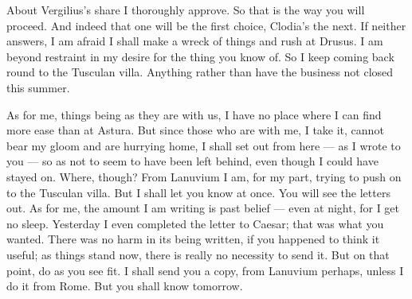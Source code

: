 

 About Vergilius's share I thoroughly approve. So that is the way you will proceed. And indeed that one will be the first choice, Clodia's the next. If neither answers, I am afraid I shall make a wreck of things and rush at Drusus. I am beyond restraint in my desire for the thing you know of. So I keep coming back round to the Tusculan villa. Anything rather than have the business not closed this summer.

 As for me, things being as they are with us, I have no place where I can find more ease than at Astura. But since those who are with me, I take it, cannot bear my gloom and are hurrying home, I shall set out from here --- as I wrote to you --- so as not to seem to have been left behind, even though I could have stayed on. Where, though? From Lanuvium I am, for my part, trying to push on to the Tusculan villa. But I shall let you know at once. You will see the letters out. As for me, the amount I am writing is past belief --- even at night, for I get no sleep. Yesterday I even completed the letter to Caesar; that was what you wanted. There was no harm in its being written, if you happened to think it useful; as things stand now, there is really no necessity to send it. But on that point, do as you see fit. I shall send you a copy, from Lanuvium perhaps, unless I do it from Rome. But you shall know tomorrow.

